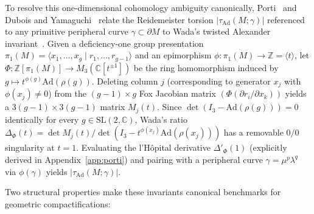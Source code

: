 \documentclass[aps,prd,twocolumn,nofootinbib,floatfix]{revtex4-2}
\begin{document}
To resolve this one-dimensional cohomology ambiguity canonically, Porti~\cite{Porti1997} and Dubois and Yamaguchi~\cite{DuboisYamaguchi2009} relate the Reidemeister torsion $|\tau_{\mathrm{Ad}}(M;\gamma)|$ referenced to any primitive peripheral curve $\gamma \subset \partial M$ to Wada's twisted Alexander invariant~\cite{Wada1994}.
Given a deficiency-one group presentation $\pi_1(M) = \langle x_1,\dots,x_g \mid r_1,\dots,r_{g-1}\rangle$ and an epimorphism $\phi: \pi_1(M) \to \mathbb{Z} = \langle t \rangle$, let $\Phi: \mathbb{Z}[\pi_1(M)] \to M_3(\mathbb{C}[t^{\pm 1}])$ be the ring homomorphism induced by $g \mapsto t^{\phi(g)}\mathrm{Ad}(\rho(g))$.
Deleting column $j$ (corresponding to generator $x_j$ with $\phi(x_j) \ne 0$) from the $(g-1)\times g$ Fox Jacobian matrix $(\Phi(\partial r_i / \partial x_k))$ yields a $3(g-1)\times 3(g-1)$ matrix $M_j(t)$.
Since $\det(I_3 - \mathrm{Ad}(\rho(g))) = 0$ identically for every $g \in \mathrm{SL}(2,\mathbb{C})$, Wada's ratio $\Delta_{\Phi}(t) = \det M_j(t) / \det(I_3 - t^{\phi(x_j)}\mathrm{Ad}(\rho(x_j)))$ has a removable $0/0$ singularity at $t = 1$.
Evaluating the l'H\^opital derivative $\Delta'_{\Phi}(1)$ (explicitly derived in Appendix~\ref{app:porti}) and pairing with a peripheral curve $\gamma = \mu^p\lambda^q$ via $\phi(\gamma)$ yields $|\tau_{\mathrm{Ad}}(M;\gamma)|$.

Two structural properties make these invariants canonical benchmarks for geometric compactifications:
\end{document}
